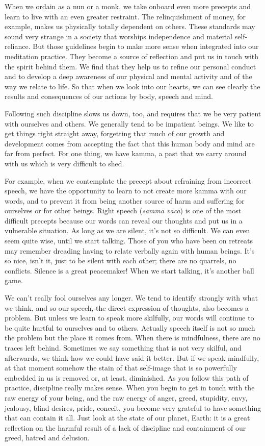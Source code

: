 When we ordain as a nun or a monk, we take onboard even more precepts and learn to live with an even greater restraint. The relinquishment of money, for example, makes us physically totally dependent on others. These standards may sound very strange in a society that worships independence and material self-reliance. But those guidelines begin to make more sense when integrated into our meditation practice. They become a source of reflection and put us in touch with the spirit behind them. We find that they help us to refine our personal conduct and to develop a deep awareness of our physical and mental activity and of the way we relate to life. So that when we look into our hearts, we can see clearly the results and consequences of our actions by body, speech and mind.

Following such discipline slows us down, too, and requires that we be very patient with ourselves and others. We generally tend to be impatient beings. We like to get things right straight away, forgetting that much of our growth and development comes from accepting the fact that this human body and mind are far from perfect. For one thing, we have kamma, a past that we carry around with us which is very difficult to shed.

For example, when we contemplate the precept about refraining from incorrect speech, we have the opportunity to learn to not create more kamma with our words, and to prevent it from being another source of harm and suffering for ourselves or for other beings. Right speech (\textit{samm\=a v\=ac\=a}) is one of the most difficult precepts because our words can reveal our thoughts and put us in a vulnerable situation. As long as we are silent, it's not so difficult. We can even seem quite wise, until we start talking. Those of you who have been on retreats may remember dreading having to relate verbally again with human beings. It's so nice, isn't it, just to be silent with each other; there are no quarrels, no conflicts. Silence is a great peacemaker! When we start talking, it's another ball game.

We can't really fool ourselves any longer. We tend to identify strongly with what we think, and so our speech, the direct expression of thoughts, also becomes a problem. But unless we learn to speak more skilfully, our words will continue to be quite hurtful to ourselves and to others. Actually speech itself is not so much the problem but the place it comes from. When there is mindfulness, there are no traces left behind. Sometimes we say something that is not very skilful, and afterwards, we think how we could have said it better. But if we speak mindfully, at that moment somehow the stain of that self-image that is so powerfully embedded in us is removed or, at least, diminished. As you follow this path of practice, discipline really makes sense. When you begin to get in touch with the raw energy of your being, and the raw energy of anger, greed, stupidity, envy, jealousy, blind desires, pride, conceit, you become very grateful to have something that can contain it all. Just look at the state of our planet, Earth: it is a great reflection on the harmful result of a lack of discipline and containment of our greed, hatred and delusion.

